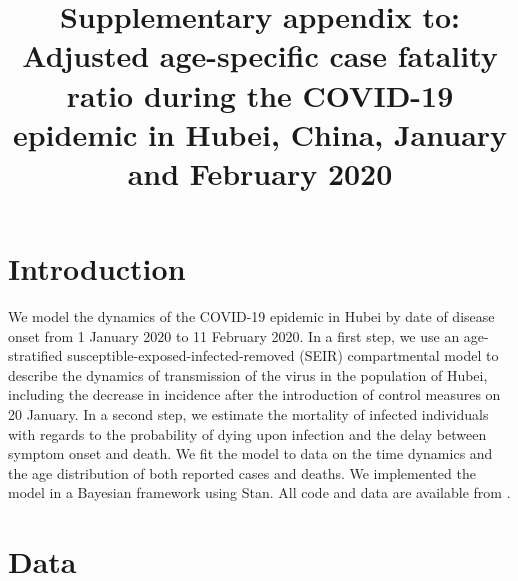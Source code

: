 \documentclass{article}
\title{Supplementary appendix to: \\ {\Large Adjusted age-specific case fatality ratio during the COVID-19 epidemic in Hubei, China, January and February 2020}}
\begin{document}
	
	\maketitle
	
	\section{Introduction}
	
	We model the dynamics of the COVID-19 epidemic in Hubei by date of disease onset from 1 January 2020 to 11 February 2020. 
	In a first step, we use an age-stratified susceptible-exposed-infected-removed (SEIR) compartmental model to describe the dynamics of transmission of the virus in the population of Hubei, including the decrease in incidence after the introduction of control measures on 20 January.
	In a second step, we estimate the mortality of infected individuals with regards to the probability of dying upon infection and the delay between symptom onset and death. 
	We fit the model to data on the time dynamics and the age distribution of both reported cases and deaths.
	We implemented the model in a Bayesian framework using Stan. 
	All code and data are available from \underline{}.
	
	\section{Data}
	
\end{document}
